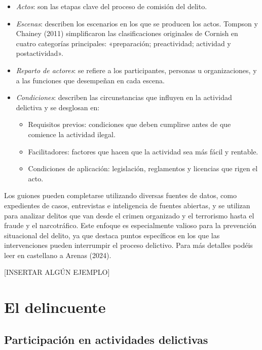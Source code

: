 \documentclass[
  spanish,
  letterpaper,
  DIV=11,
  numbers=noendperiod]{scrreprt}
\begin{document}
\begin{itemize}
\item
  \emph{Actos}: son las etapas clave del proceso de comisión del delito.
\item
  \emph{Escenas}: describen los escenarios en los que se producen los
  actos. Tompson y Chainey (2011) simplificaron las clasificaciones
  originales de Cornish en cuatro categorías principales: «preparación;
  preactividad; actividad y postactividad».
\item
  \emph{Reparto de actores}: se refiere a los participantes, personas u
  organizaciones, y a las funciones que desempeñan en cada escena.
\item
  \emph{Condiciones}: describen las circunstancias que influyen en la
  actividad delictiva y se desglosan en:

  \begin{itemize}
  \item
    Requisitos previos: condiciones que deben cumplirse antes de que
    comience la actividad ilegal.
  \item
    Facilitadores: factores que hacen que la actividad sea más fácil y
    rentable.
  \item
    Condiciones de aplicación: legislación, reglamentos y licencias que
    rigen el acto.
  \end{itemize}
\end{itemize}

Los guiones pueden completarse utilizando diversas fuentes de datos,
como expedientes de casos, entrevistas e inteligencia de fuentes
abiertas, y se utilizan para analizar delitos que van desde el crimen
organizado y el terrorismo hasta el fraude y el narcotráfico. Este
enfoque es especialmente valioso para la prevención situacional del
delito, ya que destaca puntos específicos en los que las intervenciones
pueden interrumpir el proceso delictivo. Para más detalles podéis leer
en castellano a Arenas (2024).

{[}INSERTAR ALGÚN EJEMPLO{]}

\chapter{El delincuente}\label{el-delincuente}

\section{Participación en actividades
delictivas}\label{participaciuxf3n-en-actividades-delictivas}
\end{document}
